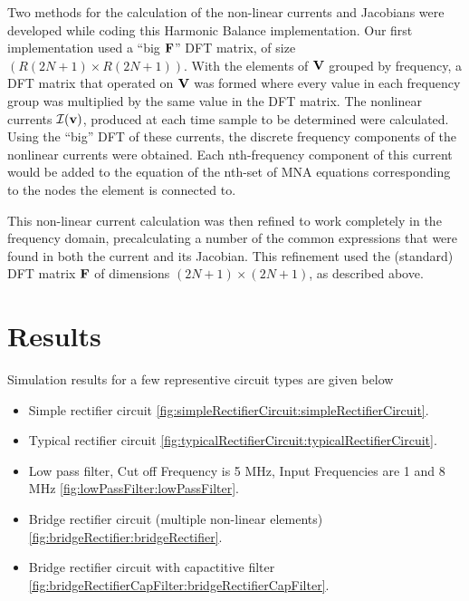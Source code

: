 \documentclass[12pt,journal,compsoc]{../ieeepaper/IEEEtran}
\begin{document}
Two methods for the calculation of the non-linear currents and Jacobians were developed while coding this Harmonic Balance implementation.  
Our first implementation used 
a ``big \( \mathbf{F} \)'' DFT matrix, of size \( ( R (2 N + 1 ) \times R (2 N + 1) ) \).  
With the elements of \( \mathbf{V} \) grouped by frequency, a DFT matrix that operated on \( \mathbf{V} \) was formed where
every value in each frequency group was multiplied by the same value in the DFT matrix.
The nonlinear currents \( \mathcal{I}(\mathbf{v}) \), produced at each time sample to be determined were calculated.  Using the 
``big'' DFT of these currents, the discrete frequency
components of the nonlinear currents were obtained.
Each nth-frequency component of this current would be added
to the equation of the nth-set of MNA equations corresponding to the nodes the element is connected
to.

This non-linear current calculation was then refined to work completely in the frequency domain, precalculating a number of the common expressions that were found in both the current and its Jacobian.  This refinement used the (standard) DFT matrix \( \mathbf{F} \) of dimensions \( (2 N + 1 ) \times (2 N + 1 ) \), as described above.  

\section{Results}

Simulation results for a few representive circuit types are given below

\begin{itemize}
\item Simple rectifier circuit \cref{fig:simpleRectifierCircuit:simpleRectifierCircuit}.
\item Typical rectifier circuit \cref{fig:typicalRectifierCircuit:typicalRectifierCircuit}.
\item Low pass filter, Cut off Frequency is 5 MHz, Input Frequencies are 1 and 8 MHz \cref{fig:lowPassFilter:lowPassFilter}.
\item Bridge rectifier circuit (multiple non-linear elements) \cref{fig:bridgeRectifier:bridgeRectifier}.
\item Bridge rectifier circuit with capactitive filter \cref{fig:bridgeRectifierCapFilter:bridgeRectifierCapFilter}.
\end{itemize}
\end{document}
